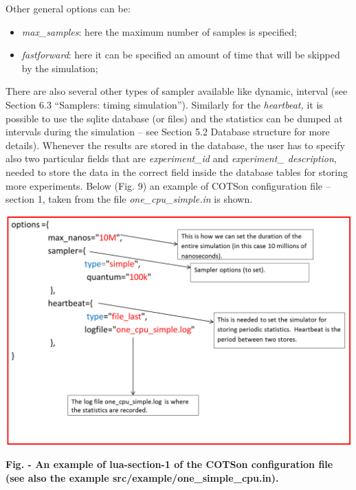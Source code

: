 \documentclass[a4paper]{article}
\newcounter{Figure}
\renewcommand\theFigure{\arabic{Figure}}
\begin{document}
\bigskip

{
Other general options can be:}

\begin{itemize}
\item {
\textit{max\_samples}: here the maximum number of samples is specified;}
\item {
\textit{fastforward}: here it can be specified an amount of time that
will be skipped by the simulation;}
\end{itemize}
{
There are also several other types of sampler available like dynamic,
interval (see Section 6.3 {\textquotedblleft}Samplers: timing
simulation{\textquotedblright}). Similarly for the \textit{heartbeat,
}it is possible to use the sqlite database (or files) and the
statistics can be dumped at intervals during the simulation -- see
Section 5.2 Database structure for more details). Whenever the results
are stored in the database, the user has to specify also two particular
fields that are \textit{experiment\_id} and \textit{experiment\_
description}, needed to store the data in the correct field inside the
database tables for storing more experiments. Below (Fig. 9) an example
of COTSon configuration file -- section 1, taken from the file
\textit{one\_cpu\_simple.in} is shown.}

{\centering 
\includegraphics[width=5.2252in,height=3.4811in]{img9.png}
\par}

{\centering{}\sffamily\bfseries
\label{bkm:Ref388170511}Fig.
\stepcounter{Figure}{\theFigure} - An example of lua-section-1 of the
COTSon configuration file (see also the example
src/example/one\_simple\_cpu.in).
\par}
\end{document}
